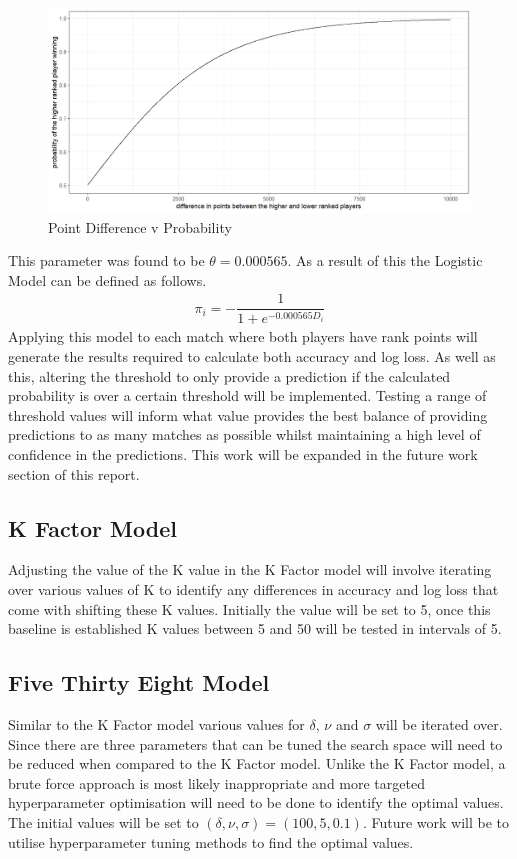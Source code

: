 \documentclass[12pt,a4paper]{article}
\begin{document}
\begin{figure}[H]
  \centering
  \includegraphics[scale=0.6]{images/logistic_curve.png}
  \caption{Point Difference v Probability}
  \label{fig:logisticcurve}
\end{figure}
This parameter was found to be $\theta = 0.000565$. As a
result of this the Logistic Model can be defined as follows.
\begin{gather}
  \pi_i = -\dfrac{1}{1+e^{-0.000565D_i}}
\end{gather}
Applying this model
to each match where both players have rank points will generate the results
required to calculate both accuracy and log loss. As well as this,
altering the threshold to only provide a prediction if the calculated probability
is over a certain threshold will be implemented. Testing a range of threshold
values will inform what value provides the best balance of providing predictions
to as many matches as possible whilst maintaining a high level of confidence in the
predictions. This work will be expanded in the future work section of this report.

\subsection{K Factor Model}
Adjusting the value of the K value in the K Factor model will involve iterating
over various values of K to identify any differences in accuracy and log loss
that come with shifting these K values. Initially the value will be set to 5,
once this baseline is established K values between 5 and 50 will be tested in
intervals of 5.

\subsection{Five Thirty Eight Model}
Similar to the K Factor model various values for $\delta$, $\nu$ and $\sigma$
will be iterated over. Since there are three parameters that can be tuned
the search space will need to be reduced when compared to the K Factor model.
Unlike the K Factor model, a brute force approach is most likely inappropriate
and more targeted hyperparameter optimisation will need to be done to identify
the optimal values.
The initial values will be set to $(\delta,\nu,\sigma) = (100,5,0.1)$. Future
work will be to utilise hyperparameter tuning methods to find the optimal values.
\end{document}
